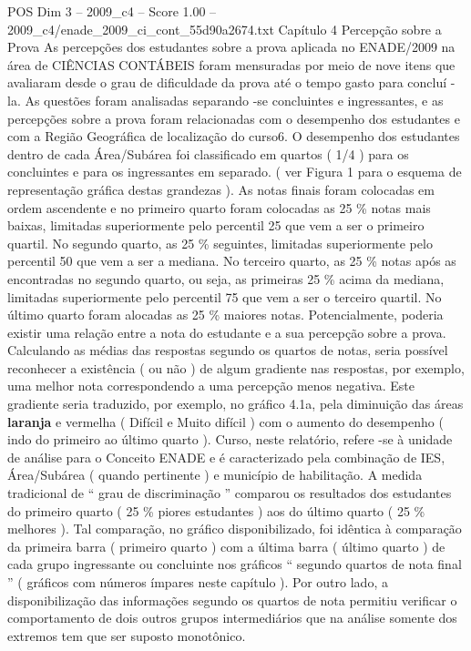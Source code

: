 \begin{textsample}{POS Dim 3 – 2009\_c4 – Score 1.00 – 2009\_c4/enade\_2009\_ci\_cont\_55d90a2674.txt}  \label{ex:f3_pos_124}
Capítulo 4 Percepção sobre a Prova As percepções dos estudantes sobre a prova aplicada no ENADE/2009 na área de CIÊNCIAS CONTÁBEIS foram mensuradas por meio de nove itens que avaliaram desde o grau de dificuldade da prova até o tempo gasto para concluí -la.
As questões foram analisadas separando -se concluintes e ingressantes, e as percepções sobre a prova foram relacionadas com o desempenho dos estudantes e com a Região Geográfica de localização do curso6.
O desempenho dos estudantes dentro de cada Área/Subárea foi classificado em quartos ( 1/4 ) para os concluintes e para os ingressantes em separado. ( ver Figura 1 para o esquema de representação gráfica destas grandezas ).
As notas finais foram colocadas em ordem ascendente e no primeiro quarto foram colocadas as 25 \% notas mais baixas, limitadas superiormente pelo percentil 25 que vem a ser o primeiro quartil.
No segundo quarto, as 25 \% seguintes, limitadas superiormente pelo percentil 50 que vem a ser a mediana.
No terceiro quarto, as 25 \% notas após as encontradas no segundo quarto, ou seja, as primeiras 25 \% acima da mediana, limitadas superiormente pelo percentil 75 que vem a ser o terceiro quartil.
No último quarto foram alocadas as 25 \% maiores notas.
Potencialmente, poderia existir uma relação entre a nota do estudante e a sua percepção sobre a prova.
Calculando as médias das respostas segundo os quartos de notas, seria possível reconhecer a existência ( ou não ) de algum gradiente nas respostas, por exemplo, uma melhor nota correspondendo a uma percepção menos negativa.
Este gradiente seria traduzido, por exemplo, no gráfico 4.1a, pela diminuição das áreas \textbf{laranja} e vermelha ( Difícil e Muito difícil ) com o aumento do desempenho ( indo do primeiro ao último quarto ).
Curso, neste relatório, refere -se à unidade de análise para o Conceito ENADE e é caracterizado pela combinação de IES, Área/Subárea ( quando pertinente ) e município de habilitação.
A medida tradicional de “ grau de discriminação ” comparou os resultados dos estudantes do primeiro quarto ( 25 \% piores estudantes ) aos do último quarto ( 25 \% melhores ).
Tal comparação, no gráfico disponibilizado, foi idêntica à comparação da primeira barra ( primeiro quarto ) com a última barra ( último quarto ) de cada grupo ingressante ou concluinte nos gráficos “ segundo quartos de nota final ” ( gráficos com números ímpares neste capítulo ).
Por outro lado, a disponibilização das informações segundo os quartos de nota permitiu verificar o comportamento de dois outros grupos intermediários que na análise somente dos extremos tem que ser suposto monotônico.

\end{textsample}
